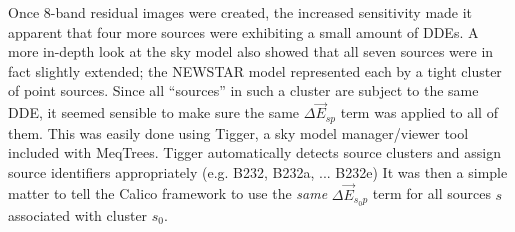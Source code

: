 \documentclass[]{aa}
\newcommand{\jones}[2]{\vec {#1}_{#2}}
\begin{document}
Once 8-band residual images were created, the increased sensitivity made it apparent that four more sources were exhibiting a small amount of DDEs. A more in-depth look at the sky model also showed that all seven sources were in fact slightly extended; the NEWSTAR model represented each by a tight cluster of point sources. Since all ``sources'' in such a cluster are subject to the same DDE, it seemed sensible to make sure the same $\Delta\jones{E}{sp}$ term was applied to all of them. This was easily done using Tigger, a sky model manager/viewer tool included with MeqTrees. Tigger automatically detects source clusters and assign source identifiers appropriately (e.g. B232, B232a, ...  B232e) It was then a simple matter to tell the Calico framework to use the \emph{same} $\Delta\jones{E}{s_0 p}$ term for all sources $s$ associated with cluster $s_0$. 
\end{document}
